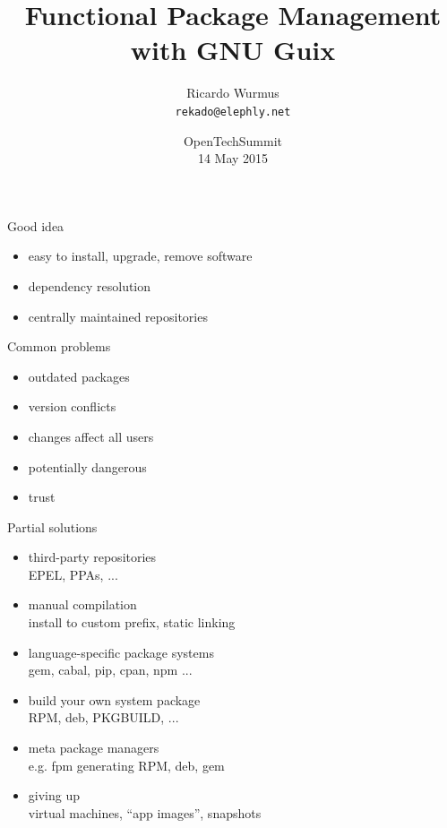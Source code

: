 \documentclass{beamer}
\title{Functional Package Management with GNU Guix}
\author{Ricardo Wurmus\\\texttt{rekado@elephly.net}}
\date{\small{OpenTechSummit\\14 May 2015}}
\begin{document}
\maketitle

\begin{frame}{Good idea}
  \Large{
  \begin{itemize}
  \item easy to install, upgrade, remove software
  \item dependency resolution
  \item centrally maintained repositories
  \end{itemize}
  }
\end{frame}

\begin{frame}{Common problems}
  \Large{
  \begin{itemize}
  \item outdated packages
  \item version conflicts
  \item changes affect all users
  \item potentially dangerous
  \item trust
  \end{itemize}
  }
\end{frame}

\begin{frame}{Partial solutions}

  \Large{
  \begin{itemize}[<+>]
  \item \alert{third-party repositories}\\
        EPEL, PPAs, ...
  \item \alert{manual compilation}\\
        install to custom prefix, static linking
  \item \alert{language-specific package systems}\\
        gem, cabal, pip, cpan, npm ...
  \item \alert{build your own system package}\\
        RPM, deb, PKGBUILD, ...
  \item \alert{meta package managers}\\
        e.g. fpm generating RPM, deb, gem
  \item \alert{giving up}\\
        virtual machines, ``app images'', snapshots
  \end{itemize}
  }
\end{frame}
\end{document}

